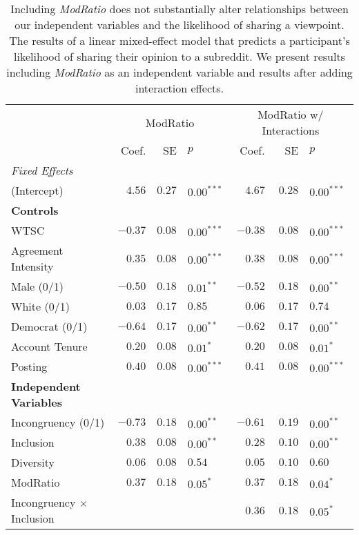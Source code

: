 \begin{table*}[]
    \footnotesize
    \centering
    \caption{Including \emph{ModRatio} does not substantially alter relationships between our independent variables and the likelihood of sharing a viewpoint. The results of a linear mixed-effect model that predicts a participant's likelihood of sharing their opinion to a subreddit. We present results including \emph{ModRatio} as an independent variable and results after adding interaction effects.}
    \begin{tabular}{lrrlrrl}
    \toprule
         & \multicolumn{3}{c}{ModRatio} & \multicolumn{3}{c}{ModRatio w/ Interactions}\\
    \cmidrule(lr){2-4} \cmidrule(lr){5-7}
     & Coef. & SE & $p$ & Coef. & SE & $p$ \\ \midrule
    \textit{Fixed Effects} & & \\
    (Intercept) & $4.56$ & $0.27$ & $0.00^{***}$ & $4.67$ & $0.28$ & $0.00^{***}$\\  \addlinespace
    \textbf{Controls} \\
    WTSC & $-0.37$ & $0.08$ & $0.00^{***}$ & $-0.38$ & $0.08$ & $0.00^{***}$ \\ 
    Agreement Intensity & $0.35$ & $0.08$ & $0.00^{***}$ & $0.38$ & $0.08$ & $0.00^{***}$\\
    Male (0/1) & $-0.50$ & $0.18$ & $0.01^{**}$ & $-0.52$ & $0.18$ & $0.00^{**}$ \\
    White (0/1) & $0.03$ & $0.17$ & $0.85$ & $0.06$ & $0.17$ &$0.74$ \\ 
    Democrat (0/1) & $-0.64$ & $0.17$ &$0.00^{**}$ & $-0.62$ & $0.17$ &$0.00^{**}$ \\
    Account Tenure &  $0.20$ & $0.08$ & $0.01^{*}$ & $0.20$ & $0.08$ & $0.01^{*}$ \\
    Posting & $0.40$ & $0.08$ & $0.00^{***}$ & $0.41$ & $0.08$ & $0.00^{***}$\\ \addlinespace
    \textbf{Independent Variables} \\
    Incongruency (0/1) & $-0.73$ & $0.18$ & $0.00^{**}$ & $-0.61$ & $0.19$ & $0.00^{**}$ \\
    Inclusion & $0.38$ & $0.08$ & $0.00^{**}$ & $0.28$ & $0.10$ & $0.00^{**}$\\
    Diversity & $0.06$ & $0.08$ & $0.54$ & $0.05$ & $0.10$ & $0.60$\\
    ModRatio & $0.37$ & $0.18$ & $0.05^{*}$ & $0.37$ & $0.18$ & $0.04^{*}$ \\ \addlinespace
    Incongruency $\times$ Inclusion & & & & $0.36$ & $0.18$&$0.05^{*}$ \\

\end{tabular}
\end{table*}
